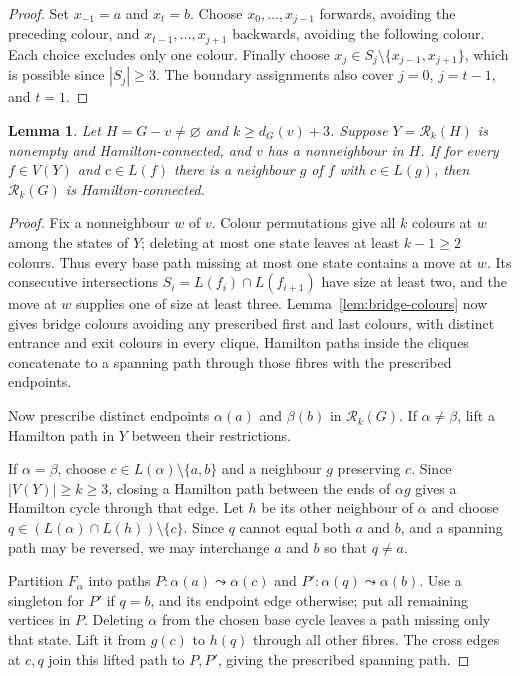 \documentclass[11pt]{article}
\newtheorem{lemma}[theorem]{Lemma}
\theoremstyle{remark}
\newcommand{\Rk}{\mathcal R_k}
\numberwithin{equation}{section}
\numberwithin{table}{section}
\begin{document}
\begin{proof}
Set $x_{-1}=a$ and $x_t=b$. Choose $x_0,\ldots,x_{j-1}$ forwards,
avoiding the preceding colour, and $x_{t-1},\ldots,x_{j+1}$
backwards, avoiding the following colour. Each choice excludes only
one colour. Finally choose $x_j\in S_j\setminus\{x_{j-1},x_{j+1}\}$,
which is possible since $|S_j|\ge3$. The boundary assignments also
cover $j=0$, $j=t-1$, and $t=1$.
\end{proof}

\begin{lemma}\label{lem:clique-endpoints}
Let $H=G-v\ne\varnothing$ and $k\ge d_G(v)+3$.
Suppose $Y=\Rk(H)$ is nonempty and Hamilton-connected, and $v$ has
a nonneighbour in $H$. If for every $f\in V(Y)$ and $c\in L(f)$
there is a neighbour $g$ of $f$ with $c\in L(g)$, then
$\Rk(G)$ is Hamilton-connected.
\end{lemma}
\begin{proof}
Fix a nonneighbour $w$ of $v$. Colour permutations give all $k$
colours at $w$ among the states of $Y$; deleting at most one state
leaves at least $k-1\ge2$ colours. Thus every base path missing at
most one state contains a move at $w$. Its consecutive intersections
$S_i=L(f_i)\cap L(f_{i+1})$ have size at least two, and the move at
$w$ supplies one of size at least three.
Lemma~\ref{lem:bridge-colours} now gives bridge colours avoiding any
prescribed first and last colours, with distinct entrance and exit
colours in every clique. Hamilton paths inside the cliques concatenate
to a spanning path through those fibres with the prescribed endpoints.

Now prescribe distinct endpoints $\alpha(a)$ and $\beta(b)$ in
$\Rk(G)$. If $\alpha\ne\beta$, lift a Hamilton path in $Y$ between
their restrictions.

If $\alpha=\beta$, choose $c\in L(\alpha)\setminus\{a,b\}$ and
a neighbour $g$ preserving $c$. Since $|V(Y)|\ge k\ge3$, closing
a Hamilton path between the ends of $\alpha g$ gives a Hamilton
cycle through that edge. Let $h$ be its other neighbour of $\alpha$
and choose $q\in(L(\alpha)\cap L(h))\setminus\{c\}$.
Since $q$ cannot equal both $a$ and $b$, and a spanning path may be
reversed, we may interchange $a$ and $b$ so that $q\ne a$.

Partition $F_\alpha$ into paths
$P:\alpha(a)\leadsto\alpha(c)$ and
$P':\alpha(q)\leadsto\alpha(b)$.
Use a singleton for $P'$ if $q=b$, and its endpoint edge otherwise;
put all remaining vertices in $P$. Deleting $\alpha$ from the chosen
base cycle leaves a path missing only that state. Lift it from $g(c)$
to $h(q)$ through all other fibres. The cross edges at $c,q$ join
this lifted path to $P,P'$, giving the prescribed spanning path.
\end{proof}
\end{document}
